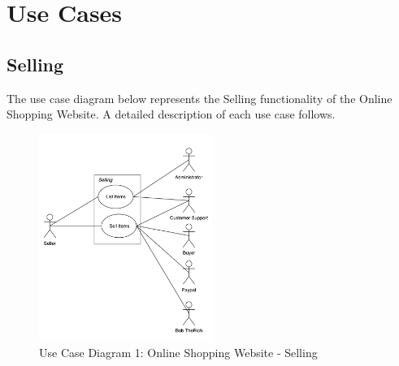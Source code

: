 \documentclass[11pt]{article}
\newcounter{use case ID}
\begin{document}
\clearpage


\section{Use Cases}
\subsection{Selling}

The use case diagram below represents the Selling functionality of the Online Shopping Website. A detailed description of each use case follows. 

\begin{figure}[htbp]
    \centering
    \includegraphics[width=0.5\textwidth]{ucd1.png}
    \caption{Use Case Diagram 1: Online Shopping Website - Selling }
    \label{fig:ucd1}
\end{figure}
\end{document}
